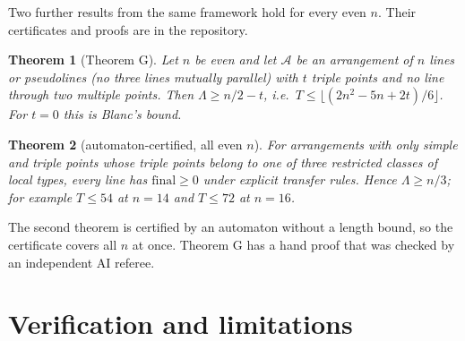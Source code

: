 \documentclass[11pt]{article}
\newtheorem{theorem}{Theorem}
\theoremstyle{definition}
\theoremstyle{remark}
\newcommand{\Lam}{\Lambda}
\begin{document}
Two further results from the same framework hold for every even $n$. Their certificates and proofs are in the
repository.
\begin{theorem}[Theorem G]
Let $n$ be even and let $\mathcal A$ be an arrangement of $n$ lines or pseudolines (no three lines mutually parallel)
with $t$ triple points and no line
through two multiple points. Then $\Lam\ge n/2-t$, i.e.\ $T\le\lfloor(2n^2-5n+2t)/6\rfloor$. For $t=0$ this is Blanc's
bound.
\end{theorem}
\begin{theorem}[automaton-certified, all even $n$]
For arrangements with only simple and triple points whose triple points belong to one of three restricted classes of
local types, every line has $\mathrm{final}\ge 0$ under explicit transfer rules. Hence $\Lam\ge n/3$; for example
$T\le 54$ at $n=14$ and $T\le 72$ at $n=16$.
\end{theorem}
\noindent The second theorem is certified by an automaton without a length bound, so the certificate covers all $n$
at once. Theorem G has a hand proof that was checked by an independent AI referee.

\section{Verification and limitations}\label{sec:verify}
\end{document}
